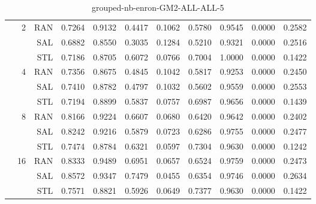 \begin{center}
\begin{table}[htbp]
\begin{tabular}{ | r | r | r | r | r | r | r | r | r | r | r |}
 & \multirow{3}{*}{2} & RAN & 0.7264 & 0.9132 & 0.4417 & 0.1062 & 0.5780 & 0.9545 & 0.0000 & 0.2582\\ \cline{3-11}
 &   & SAL & 0.6882 & 0.8550 & 0.3035 & 0.1284 & 0.5210 & 0.9321 & 0.0000 & 0.2516\\ \cline{3-11}
 &   & STL & 0.7186 & 0.8705 & 0.6072 & 0.0766 & 0.7004 & 1.0000 & 0.0000 & 0.1422\\ \cline{2-11}
 & \multirow{3}{*}{4} & RAN & 0.7356 & 0.8675 & 0.4845 & 0.1042 & 0.5817 & 0.9253 & 0.0000 & 0.2450\\ \cline{3-11}
 &   & SAL & 0.7410 & 0.8782 & 0.4797 & 0.1032 & 0.5602 & 0.9559 & 0.0000 & 0.2553\\ \cline{3-11}
 &   & STL & 0.7194 & 0.8899 & 0.5837 & 0.0757 & 0.6987 & 0.9656 & 0.0000 & 0.1439\\ \cline{2-11}
 & \multirow{3}{*}{8} & RAN & 0.8166 & 0.9224 & 0.6607 & 0.0680 & 0.6420 & 0.9642 & 0.0000 & 0.2402\\ \cline{3-11}
 &   & SAL & 0.8242 & 0.9216 & 0.5879 & 0.0723 & 0.6286 & 0.9755 & 0.0000 & 0.2477\\ \cline{3-11}
 &   & STL & 0.7474 & 0.8784 & 0.6321 & 0.0597 & 0.7304 & 0.9630 & 0.0000 & 0.1242\\ \cline{2-11}
 & \multirow{3}{*}{16} & RAN & 0.8333 & 0.9489 & 0.6951 & 0.0657 & 0.6524 & 0.9759 & 0.0000 & 0.2473\\ \cline{3-11}
 &   & SAL & 0.8572 & 0.9347 & 0.7479 & 0.0455 & 0.6354 & 0.9746 & 0.0000 & 0.2634\\ \cline{3-11}
 &   & STL & 0.7571 & 0.8821 & 0.5926 & 0.0649 & 0.7377 & 0.9630 & 0.0000 & 0.1422\\ \cline{2-11}
\hline
\end{tabular}
\caption{grouped-nb-enron-GM2-ALL-ALL-5}
\end{table}
\end{center}

